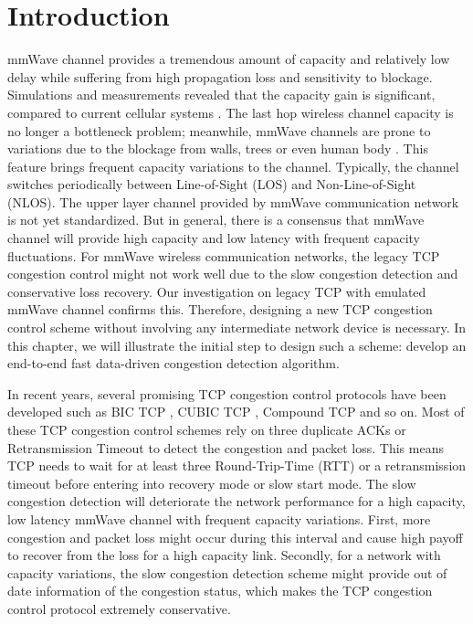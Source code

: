\section{Introduction}
\par  mmWave channel provides a tremendous amount of capacity and relatively low delay while suffering from high propagation loss and sensitivity to blockage. Simulations and measurements revealed that the capacity gain is significant, compared to current cellular systems \cite{akdeniz2014millimeter,bai2015coverage}. The last hop wireless channel capacity is no longer a bottleneck problem; meanwhile, mmWave channels are prone to variations due to the blockage from walls, trees or even human body \cite{lu2012modeling, zhao201328, alejos2008measurement}. This feature brings frequent capacity variations to the channel. Typically, the channel switches periodically between Line-of-Sight (LOS) and Non-Line-of-Sight (NLOS). The upper layer channel provided by mmWave communication network is not yet standardized. But in general, there is a consensus that mmWave channel will provide high capacity and low latency with frequent capacity fluctuations. For mmWave wireless communication networks, the legacy TCP congestion control might not work well due to the slow congestion detection and conservative loss recovery. Our investigation on legacy TCP with emulated mmWave channel confirms this. Therefore, designing a new TCP congestion control scheme without involving any intermediate network device is necessary. In this chapter, we will illustrate the initial step to design such a scheme: develop an end-to-end fast data-driven congestion detection algorithm.
\par In recent years, several promising TCP congestion control protocols have been developed such as BIC TCP \cite{xu2004binary}, CUBIC TCP \cite{ha2008cubic}, Compound TCP \cite{tan2006compound} and so on. Most of these TCP congestion control schemes rely on three duplicate ACKs or Retransmission Timeout to detect the congestion and packet loss. This means TCP needs to wait for at least three Round-Trip-Time (RTT) or a retransmission timeout before entering into recovery mode or slow start mode. The slow congestion detection will deteriorate the network performance for a high capacity, low latency mmWave channel with frequent capacity variations. First, more congestion and packet loss might occur during this interval and cause high payoff to recover from the loss for a high capacity link. Secondly, for a network with capacity variations, the slow congestion detection scheme might provide out of date information of the congestion status, which makes the TCP congestion control protocol extremely conservative.
